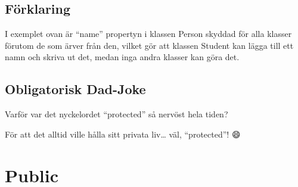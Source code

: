 \hypertarget{cb1}{}
\begin{Shaded}
\begin{Highlighting}[]
 \OperatorTok{\{}
     \OperatorTok{;}
\OperatorTok{\}}

 \OperatorTok{\{}
     \OperatorTok{(}\OperatorTok{)} \OperatorTok{\{}
         \OperatorTok{=}\OperatorTok{;}
    \OperatorTok{\}}

  \OperatorTok{()} \OperatorTok{\{}
    \OperatorTok{(} \OperatorTok{+}\OperatorTok{);}
\OperatorTok{\}}
\end{Highlighting}
\end{Shaded}

\hypertarget{fuxf6rklaring}{%
\subsection{Förklaring}\label{fuxf6rklaring}}

I exemplet ovan är ``name'' propertyn i klassen Person skyddad för alla
klasser förutom de som ärver från den, vilket gör att klassen Student
kan lägga till ett namn och skriva ut det, medan inga andra klasser kan
göra det.

\hypertarget{obligatorisk-dad-joke}{%
\subsection{Obligatorisk Dad-Joke}\label{obligatorisk-dad-joke}}

Varför var det nyckelordet ``protected'' så nervöst hela tiden?

För att det alltid ville hålla sitt privata liv\ldots{} väl,
``protected''! 😄

\hypertarget{public}{%
\section{Public}\label{public}}

